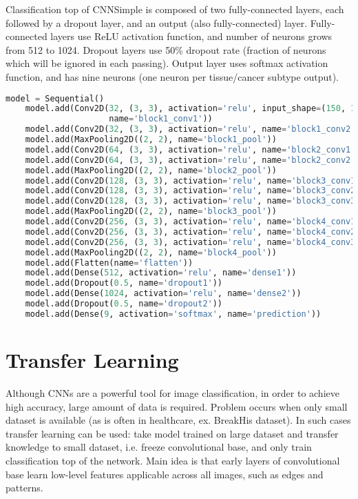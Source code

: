 Classification top of CNNSimple is composed of two fully-connected layers, each followed by a dropout layer, and an output (also fully-connected) layer. Fully-connected layers use ReLU activation function, and number of neurons grows from 512 to 1024. Dropout layers use 50\% dropout rate (fraction of neurons which will be ignored in each passing). Output layer uses softmax activation function, and has nine neurons (one neuron per tissue/cancer subtype output). 
\vspace{1mm}
\begin{lstlisting}[language={Python}, basicstyle=\scriptsize]
	model = Sequential()
	model.add(Conv2D(32, (3, 3), activation='relu', input_shape=(150, 150, 3),     
	                 name='block1_conv1'))
	model.add(Conv2D(32, (3, 3), activation='relu', name='block1_conv2'))
	model.add(MaxPooling2D((2, 2), name='block1_pool'))
	model.add(Conv2D(64, (3, 3), activation='relu', name='block2_conv1'))
	model.add(Conv2D(64, (3, 3), activation='relu', name='block2_conv2'))
	model.add(MaxPooling2D((2, 2), name='block2_pool'))
	model.add(Conv2D(128, (3, 3), activation='relu', name='block3_conv1'))
	model.add(Conv2D(128, (3, 3), activation='relu', name='block3_conv2'))
	model.add(Conv2D(128, (3, 3), activation='relu', name='block3_conv3'))
	model.add(MaxPooling2D((2, 2), name='block3_pool'))
	model.add(Conv2D(256, (3, 3), activation='relu', name='block4_conv1'))
	model.add(Conv2D(256, (3, 3), activation='relu', name='block4_conv2'))
	model.add(Conv2D(256, (3, 3), activation='relu', name='block4_conv3'))
	model.add(MaxPooling2D((2, 2), name='block4_pool'))
	model.add(Flatten(name='flatten'))
	model.add(Dense(512, activation='relu', name='dense1'))
	model.add(Dropout(0.5, name='dropout1'))
	model.add(Dense(1024, activation='relu', name='dense2'))
	model.add(Dropout(0.5, name='dropout2'))
	model.add(Dense(9, activation='softmax', name='prediction'))
\end{lstlisting} 

\section{Transfer Learning}
\label{vgg19}

Although CNNs are a powerful tool for image classification, in order to achieve high accuracy, large amount of data is required. Problem occurs when only small dataset is available (as is often in healthcare, ex. BreakHis dataset). In such cases transfer learning can be used: take model trained on large dataset and transfer knowledge to small dataset, i.e. freeze convolutional base, and only train classification top of the network. Main idea is that early layers of convolutional base learn low-level features applicable across all images, such as edges and patterns.

